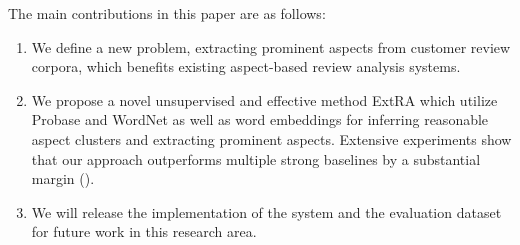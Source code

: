 The main contributions in this paper are as follows:
\begin{enumerate}
	\item We define a new problem, extracting prominent aspects from customer review corpora, which benefits existing aspect-based review analysis systems.
	
	\item We propose a novel unsupervised and effective method ExtRA which utilize 
	Probase and WordNet as well as word embeddings
	 for inferring reasonable aspect clusters 
	and extracting prominent aspects.
	Extensive experiments show that our approach outperforms 
	multiple strong baselines by a substantial
	margin (). 
	
    \item We will release the implementation of the system and the
     evaluation dataset for future work in this research area.
\end{enumerate}

%

